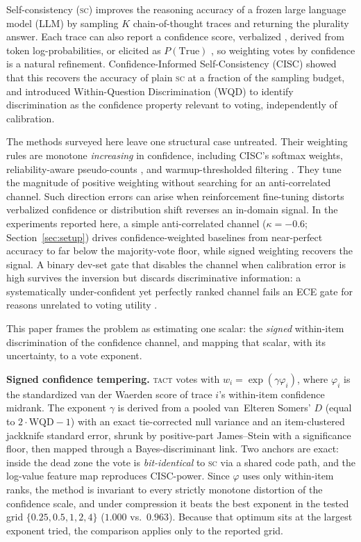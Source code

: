 \documentclass[conference]{IEEEtran}
\newcommand{\SC}{\textsc{sc}}
\newcommand{\TACT}{\textsc{tact}}
\begin{document}
Self-consistency (\SC) \cite{wang2023selfconsistency} improves the reasoning accuracy of a frozen large language model (LLM) by sampling $K$ chain-of-thought traces and returning the plurality answer. Each trace can also report a confidence score, verbalized \cite{tian2023just,xiong2024can}, derived from token log-probabilities, or elicited as $P(\text{True})$ \cite{kadavath2022language}, so weighting votes by confidence is a natural refinement. Confidence-Informed Self-Consistency (CISC) \cite{taubenfeld2025cisc} showed that this recovers the accuracy of plain \SC{} at a fraction of the sampling budget, and introduced Within-Question Discrimination (WQD) to identify discrimination as the confidence property relevant to voting, independently of calibration.

The methods surveyed here leave one structural case untreated. Their weighting
rules are monotone \emph{increasing} in confidence, including CISC's softmax
weights, reliability-aware pseudo-counts \cite{reasc2026}, and
warmup-thresholded filtering \cite{deepconf2025}. They tune the magnitude of
positive weighting without searching for an anti-correlated channel. Such
direction errors can arise when reinforcement fine-tuning distorts verbalized
confidence or distribution shift reverses an in-domain signal. In the
experiments reported here, a simple anti-correlated channel ($\kappa=-0.6$;
Section~\ref{sec:setup}) drives confidence-weighted baselines from near-perfect
accuracy to far below the majority-vote floor, while signed weighting recovers
the signal. A binary dev-set gate that disables the channel when calibration
error is high survives the inversion but discards discriminative information:
a systematically under-confident yet perfectly ranked channel fails an ECE
gate for reasons unrelated to voting utility
\cite{taubenfeld2025cisc,huang2024rankcalibration}.

This paper frames the problem as estimating one scalar: the \emph{signed} within-item discrimination of the confidence channel, and mapping that scalar, with its uncertainty, to a vote exponent.

\textbf{Signed confidence tempering.} \TACT{} votes with
$w_i=\exp(\gamma\varphi_i)$, where $\varphi_i$ is the standardized van der
Waerden score of trace $i$'s within-item confidence midrank. The exponent
$\gamma$ is derived from a pooled van~Elteren Somers' $D$ (equal to
$2\cdot\mathrm{WQD}-1$) with an exact tie-corrected null variance and an
item-clustered jackknife standard error, shrunk by positive-part James--Stein
with a significance floor, then mapped through a Bayes-discriminant link. Two
anchors are exact: inside the dead zone the vote is \emph{bit-identical} to
\SC{} via a shared code path, and the log-value feature map reproduces
CISC-power. Since $\varphi$ uses only within-item ranks, the method is
invariant to every strictly monotone distortion of the confidence scale, and
under compression it beats the best exponent in the tested grid
$\{0.25,0.5,1,2,4\}$ ($1.000$ vs.\ $0.963$). Because that optimum sits at the
largest exponent tried, the comparison applies only to the reported grid.
\end{document}
